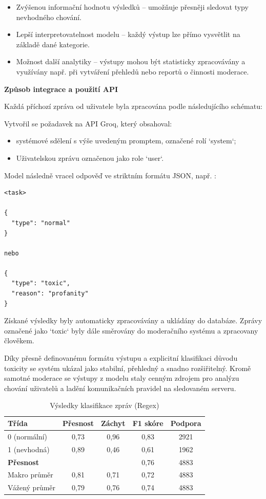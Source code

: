 \documentclass[FM,Proj]{tulthesis}
\begin{document}
\begin{itemize}
    \item Zvýšenou informační hodnotu výsledků – umožňuje přesněji sledovat typy nevhodného chování.
    \item Lepší interpretovatelnost modelu – každý výstup lze přímo vysvětlit na základě dané kategorie.
    \item Možnost další analytiky – výstupy mohou být statisticky zpracovávány a využívány např. při vytváření přehledů nebo reportů o činnosti moderace.
\end{itemize}
\textbf{Způsob integrace a použití API}

Každá příchozí zpráva od uživatele byla zpracována podle následujícího schématu:

 Vytvořil se požadavek na API Groq, který obsahoval:
    \begin{itemize}
        \item systémové sdělení s výše uvedeným promptem, označené rolí `system`;
        \item Uživatelskou zprávu označenou jako role `user`.
    \end{itemize}
 Model následně vracel odpověď ve striktním formátu JSON, např. :
\begin{verbatim}
<task>

{
  "type": "normal"
}

nebo

{
  "type": "toxic",
  "reason": "profanity"
}
\end{verbatim}
Získané výsledky byly automaticky zpracovávány a ukládány do databáze. Zprávy označené jako `toxic` byly dále směrovány do moderačního systému a zpracovany člověkem.

Díky přesně definovanému formátu výstupu a explicitní klasifikaci důvodu toxicity se systém ukázal jako stabilní, přehledný a snadno rozšiřitelný. Kromě samotné moderace se výstupy z modelu staly cenným zdrojem pro analýzu chování uživatelů a ladění komunikačních pravidel na sledovaném serveru.

\begin{table}[H]
\centering
\caption{Výsledky klasifikace zpráv (Regex)}
\begin{tabular}{lcccc}
\hline
\textbf{Třída} & \textbf{Přesnost} & \textbf{Záchyt} & \textbf{F1 skóre} & \textbf{Podpora} \\
\hline
0 (normální)   & 0{,}73 & 0{,}96 & 0{,}83 & 2921 \\
1 (nevhodná)   & 0{,}89 & 0{,}46 & 0{,}61 & 1962 \\
\hline
\textbf{Přesnost} & & & {0{,}76} & 4883 \\
\hline
Makro průměr   & 0{,}81 & 0{,}71 & 0{,}72 & 4883 \\
Vážený průměr  & 0{,}79 & 0{,}76 & 0{,}74 & 4883 \\
\hline
\end{tabular}
\label{tab:regex-results}
\end{table}
\end{document}
